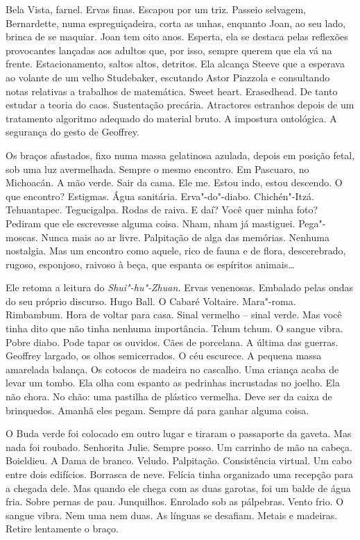 Bela Vista, farnel. Ervas finas. Escapou por um triz. Passeio selvagem,
Bernardette, numa espreguiçadeira, corta as unhas, enquanto Joan, ao seu
lado, brinca de se maquiar. Joan tem oito anos. Esperta, ela se destaca
pelas reflexões provocantes lançadas aos adultos que, por isso, sempre
querem que ela vá na frente. Estacionamento, saltos altos, detritos. Ela
alcança Steeve que a esperava ao volante de um velho Studebaker,
escutando Astor Piazzola e consultando notas relativas a trabalhos de
matemática. Sweet heart. Erasedhead. De tanto estudar a teoria do caos. %
Sustentação precária. Atractores estranhos depois de um tratamento
algoritmo adequado do material bruto. A impostura ontológica. A
segurança do gesto de Geoffrey.

Os braços afastados, fixo numa massa gelatinosa azulada, depois em
posição fetal, sob uma luz avermelhada. Sempre o mesmo encontro. Em
Pascuaro, no Michoacán. A mão verde. Sair da cama. Ele me. Estou indo,
estou descendo. O que encontro? Estigmas. Água sanitária. Erva"-do"-diabo.
Chichén"-Itzá. Tehuantapec. Tegucigalpa. Rodas de raiva. E daí? Você quer
minha foto? Pediram que ele escrevesse alguma coisa. Nham, nham já
mastiguei. Pega"-moscas. Nunca mais ao ar livre. Palpitação de alga das
memórias. Nenhuma nostalgia. Mas um encontro como aquele, rico de fauna
e de flora, descerebrado, rugoso, esponjoso, raivoso à beça, que espanta
os espíritos animais\ldots{}

Ele retoma a leitura do \emph{Shui"-hu"-Zhuan.} Ervas venenosas. Embalado
pelas ondas do seu próprio discurso. Hugo Ball. O Cabaré Voltaire.
Mara"-roma. Rimbambum. Hora de voltar para casa. Sinal vermelho -- sinal
verde. Mas você tinha dito que não tinha nenhuma importância. Tchum
tchum. O sangue vibra. Pobre diabo. Pode tapar os ouvidos. Cães de
porcelana. A última das guerras. Geoffrey largado, os olhos
semicerrados. O céu escurece. A pequena massa amarelada balança. Os
cotocos de madeira no cascalho. Uma criança acaba de levar um tombo. Ela
olha com espanto as pedrinhas incrustadas no joelho. Ela não chora. No
chão: uma pastilha de plástico vermelha. Deve ser da caixa de
brinquedos. Amanhã eles pegam. Sempre dá para ganhar alguma coisa.

O Buda verde foi colocado em outro lugar e tiraram o passaporte da
gaveta. Mas nada foi roubado. Senhorita Julie. Sempre posso. Um carrinho
de mão na cabeça. Boieldieu. A Dama de branco. Veludo. Palpitação.
Consistência virtual. Um cabo entre dois edifícios. Borrasca de neve.
Felícia tinha organizado uma recepção para a chegada dele. Mas quando
ele chega com as duas garotas, foi um balde de água fria. Sobre pernas
de pau. Junquilhos. Enrolado sob as pálpebras. Vento frio. O sangue
vibra. Nem uma nem duas. As línguas se desafiam. Metais e madeiras.
Retire lentamente o braço.


